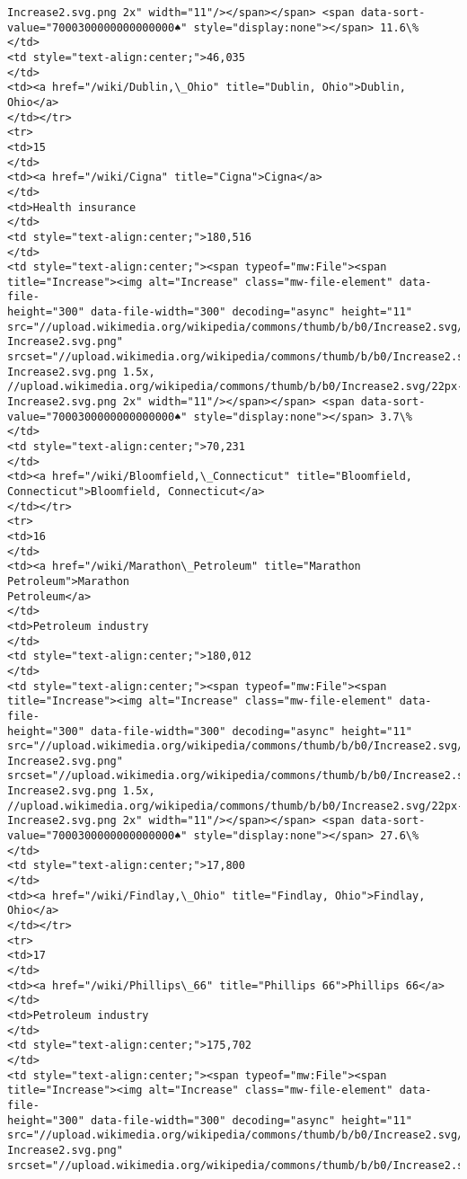\documentclass[11pt]{article}
\begin{document}
\begin{Verbatim}[commandchars=\\\{\}]
Increase2.svg.png 2x" width="11"/></span></span> <span data-sort-
value="7000300000000000000♠" style="display:none"></span> 11.6\%
</td>
<td style="text-align:center;">46,035
</td>
<td><a href="/wiki/Dublin,\_Ohio" title="Dublin, Ohio">Dublin, Ohio</a>
</td></tr>
<tr>
<td>15
</td>
<td><a href="/wiki/Cigna" title="Cigna">Cigna</a>
</td>
<td>Health insurance
</td>
<td style="text-align:center;">180,516
</td>
<td style="text-align:center;"><span typeof="mw:File"><span
title="Increase"><img alt="Increase" class="mw-file-element" data-file-
height="300" data-file-width="300" decoding="async" height="11"
src="//upload.wikimedia.org/wikipedia/commons/thumb/b/b0/Increase2.svg/11px-
Increase2.svg.png"
srcset="//upload.wikimedia.org/wikipedia/commons/thumb/b/b0/Increase2.svg/17px-
Increase2.svg.png 1.5x,
//upload.wikimedia.org/wikipedia/commons/thumb/b/b0/Increase2.svg/22px-
Increase2.svg.png 2x" width="11"/></span></span> <span data-sort-
value="7000300000000000000♠" style="display:none"></span> 3.7\%
</td>
<td style="text-align:center;">70,231
</td>
<td><a href="/wiki/Bloomfield,\_Connecticut" title="Bloomfield,
Connecticut">Bloomfield, Connecticut</a>
</td></tr>
<tr>
<td>16
</td>
<td><a href="/wiki/Marathon\_Petroleum" title="Marathon Petroleum">Marathon
Petroleum</a>
</td>
<td>Petroleum industry
</td>
<td style="text-align:center;">180,012
</td>
<td style="text-align:center;"><span typeof="mw:File"><span
title="Increase"><img alt="Increase" class="mw-file-element" data-file-
height="300" data-file-width="300" decoding="async" height="11"
src="//upload.wikimedia.org/wikipedia/commons/thumb/b/b0/Increase2.svg/11px-
Increase2.svg.png"
srcset="//upload.wikimedia.org/wikipedia/commons/thumb/b/b0/Increase2.svg/17px-
Increase2.svg.png 1.5x,
//upload.wikimedia.org/wikipedia/commons/thumb/b/b0/Increase2.svg/22px-
Increase2.svg.png 2x" width="11"/></span></span> <span data-sort-
value="7000300000000000000♠" style="display:none"></span> 27.6\%
</td>
<td style="text-align:center;">17,800
</td>
<td><a href="/wiki/Findlay,\_Ohio" title="Findlay, Ohio">Findlay, Ohio</a>
</td></tr>
<tr>
<td>17
</td>
<td><a href="/wiki/Phillips\_66" title="Phillips 66">Phillips 66</a>
</td>
<td>Petroleum industry
</td>
<td style="text-align:center;">175,702
</td>
<td style="text-align:center;"><span typeof="mw:File"><span
title="Increase"><img alt="Increase" class="mw-file-element" data-file-
height="300" data-file-width="300" decoding="async" height="11"
src="//upload.wikimedia.org/wikipedia/commons/thumb/b/b0/Increase2.svg/11px-
Increase2.svg.png"
srcset="//upload.wikimedia.org/wikipedia/commons/thumb/b/b0/Increase2.svg/17px-

\end{Verbatim}
\end{document}
